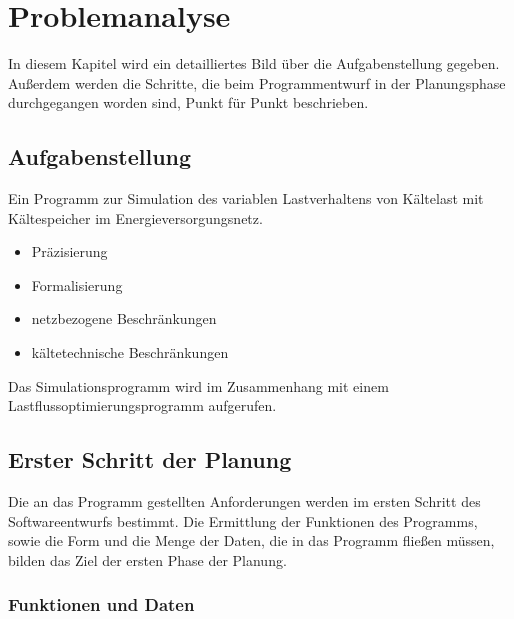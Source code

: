 \chapter{Problemanalyse}
\label{chap:problemstellung}
\minitoc

In diesem Kapitel wird ein detailliertes Bild über die Aufgabenstellung gegeben. Außerdem werden die Schritte, die beim
Programmentwurf in der Planungsphase durchgegangen worden sind, Punkt für Punkt beschrieben.

\section{Aufgabenstellung}

Ein Programm zur Simulation des variablen Lastverhaltens von Kältelast mit Kältespeicher im
Energieversorgungsnetz.

\begin{itemize}
	\item Präzisierung
	\item Formalisierung
\end{itemize}

\begin{itemize}
	\item netzbezogene Beschränkungen
	\item kältetechnische Beschränkungen
\end{itemize}

Das Simulationsprogramm wird im Zusammenhang mit einem Lastflussoptimierungsprogramm aufgerufen.

\section{Erster Schritt der Planung}

Die an das Programm gestellten Anforderungen werden im ersten Schritt des Softwareentwurfs bestimmt. Die Ermittlung
der Funktionen des Programms, sowie die Form und die Menge der Daten, die in das Programm fließen müssen, bilden das Ziel der
ersten Phase der Planung.

\subsection{Funktionen und Daten}

